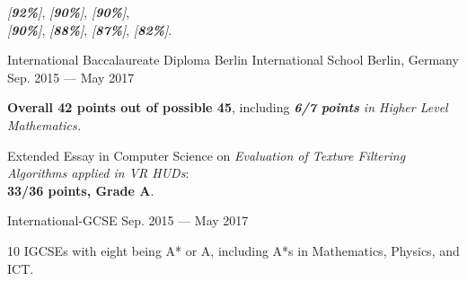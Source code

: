 \begin{cventries}
{\begin{cvitems}
{\begin{flushleft}
                             \textit{[\textbf{92\%}]},
                             \textit{[\textbf{90\%}]},
                             \textit{[\textbf{90\%}]}, \\
                             \textit{[\textbf{90\%}]},
                             \textit{[\textbf{88\%}]},
                             \textit{[\textbf{87\%}]},
                             \textit{[\textbf{82\%}]}.
                        \end{flushleft}
                  }
        \end{cvitems}
    }

    \cventry
    {International Baccalaureate Diploma} %
    {Berlin International School} %
    {Berlin, Germany} %
    {Sep. 2015 --- May 2017} %
    {
        \begin{cvitems} %
            \item {\textbf{Overall 42 points out of possible 45}, including \emph{\textbf{6/7 points} in Higher Level Mathematics.}}
            \item {Extended Essay in Computer Science on \textit{Evaluation of Texture Filtering Algorithms applied in VR HUDs}:\\
                        \textbf{33/36 points, Grade A}.}
        \end{cvitems}
    }

    \cventry
    {International-GCSE} %
    {} %
    {} %
    {Sep. 2015 --- May 2017} %
    {
        \begin{cvitems} %
            \item {10 IGCSEs with eight being A* or A, including A*s in Mathematics, Physics, and ICT.}
        \end{cvitems}
    }

\end{cventries}
